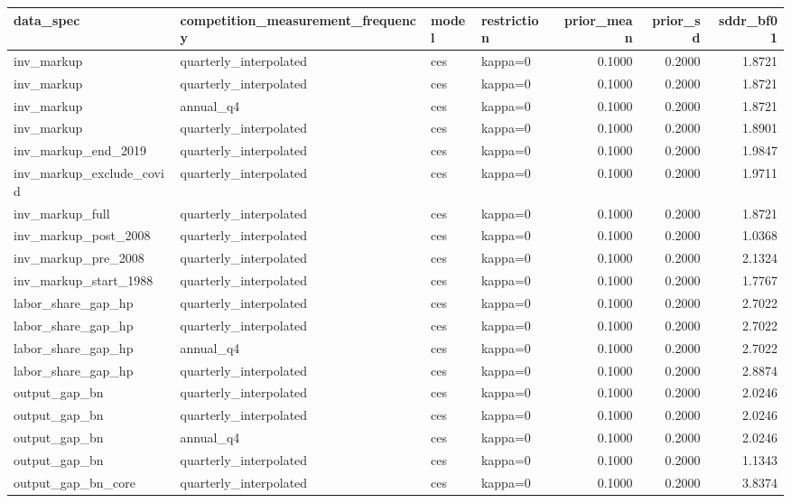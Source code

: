 \begin{tabular}{llllrrr}
\toprule
data\_spec & competition\_measurement\_frequency & model & restriction & prior\_mean & prior\_sd & sddr\_bf01 \\
\midrule
inv\_markup & quarterly\_interpolated & ces & kappa=0 & 0.1000 & 0.2000 & 1.8721 \\
inv\_markup & quarterly\_interpolated & ces & kappa=0 & 0.1000 & 0.2000 & 1.8721 \\
inv\_markup & annual\_q4 & ces & kappa=0 & 0.1000 & 0.2000 & 1.8721 \\
inv\_markup & quarterly\_interpolated & ces & kappa=0 & 0.1000 & 0.2000 & 1.8901 \\
inv\_markup\_end\_2019 & quarterly\_interpolated & ces & kappa=0 & 0.1000 & 0.2000 & 1.9847 \\
inv\_markup\_exclude\_covid & quarterly\_interpolated & ces & kappa=0 & 0.1000 & 0.2000 & 1.9711 \\
inv\_markup\_full & quarterly\_interpolated & ces & kappa=0 & 0.1000 & 0.2000 & 1.8721 \\
inv\_markup\_post\_2008 & quarterly\_interpolated & ces & kappa=0 & 0.1000 & 0.2000 & 1.0368 \\
inv\_markup\_pre\_2008 & quarterly\_interpolated & ces & kappa=0 & 0.1000 & 0.2000 & 2.1324 \\
inv\_markup\_start\_1988 & quarterly\_interpolated & ces & kappa=0 & 0.1000 & 0.2000 & 1.7767 \\
labor\_share\_gap\_hp & quarterly\_interpolated & ces & kappa=0 & 0.1000 & 0.2000 & 2.7022 \\
labor\_share\_gap\_hp & quarterly\_interpolated & ces & kappa=0 & 0.1000 & 0.2000 & 2.7022 \\
labor\_share\_gap\_hp & annual\_q4 & ces & kappa=0 & 0.1000 & 0.2000 & 2.7022 \\
labor\_share\_gap\_hp & quarterly\_interpolated & ces & kappa=0 & 0.1000 & 0.2000 & 2.8874 \\
output\_gap\_bn & quarterly\_interpolated & ces & kappa=0 & 0.1000 & 0.2000 & 2.0246 \\
output\_gap\_bn & quarterly\_interpolated & ces & kappa=0 & 0.1000 & 0.2000 & 2.0246 \\
output\_gap\_bn & annual\_q4 & ces & kappa=0 & 0.1000 & 0.2000 & 2.0246 \\
output\_gap\_bn & quarterly\_interpolated & ces & kappa=0 & 0.1000 & 0.2000 & 1.1343 \\
output\_gap\_bn\_core & quarterly\_interpolated & ces & kappa=0 & 0.1000 & 0.2000 & 3.8374 \\

\end{tabular}
